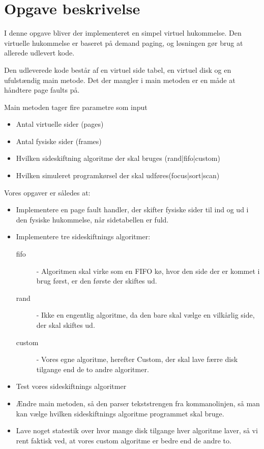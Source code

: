 \section{Opgave beskrivelse}

I denne opgave bliver der implementeret en simpel virtuel hukommelse. Den virtuelle hukommelse er baseret på demand paging, og løsningen gør brug at allerede udlevert kode.

Den udleverede kode består af en virtuel side tabel, en virtuel disk og en ufulstændig main metode. Det der mangler i main metoden er en måde at håndtere page faults på.

Main metoden tager fire parametre som input

\begin{itemize}
\item Antal virtuelle sider (pages)
\item Antal fysiske sider (frames)
\item Hvilken sideskiftning algoritme der skal bruges (rand|fifo|custom)
\item Hvilken simuleret programkørsel der skal udføres(focus|sort|scan)
\end{itemize} 

Vores opgaver er således at:

\begin{itemize}
\item Implementere en page fault handler, der skifter fysiske sider til ind og ud i den fysiske hukommelse, når sidetabellen er fuld.

\item Implementere tre sideskiftnings algoritmer: 

\begin{description}
\item[fifo] - Algoritmen skal virke som en FIFO kø, hvor den side der er kommet i brug først, er den første der skiftes ud. 
\item[rand] - Ikke en engentlig algoritme, da den bare skal vælge en vilkårlig side, der skal skiftes ud.
\item[custom] - Vores egne algoritme, herefter Custom, der skal lave færre disk tilgange end de to andre algoritmer.
\end{description}

\item Test vores sideskiftnings algoritmer

\item Ændre main metoden, så den parser tekststrengen fra kommanolinjen, så man kan vælge hvilken sideskiftnings algoritme programmet skal bruge.

\item Lave noget statestik over hvor mange disk tilgange hver algoritme laver, så vi rent faktisk ved, at vores custom algoritme er bedre end de andre to.
\end{itemize}